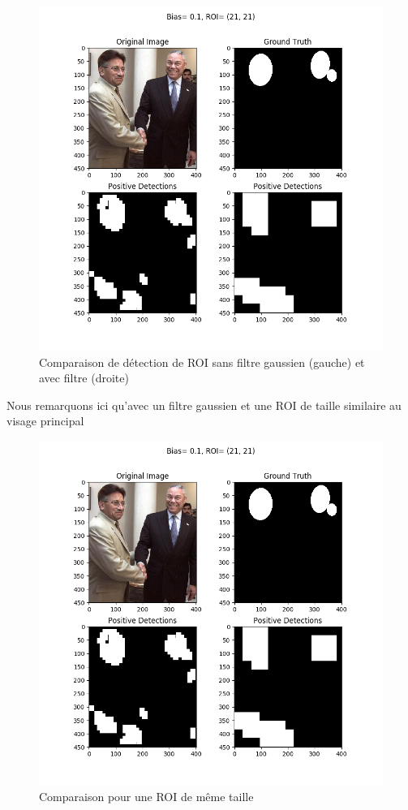 \documentclass[a4paper,11pt]{article}
\begin{document}
\begin{figure}[!h]
\begin{center}
    \includegraphics[scale=0.5]{gaussian_fig1.png}
    \caption{Comparaison de détection de ROI sans filtre gaussien (gauche) et avec
     filtre (droite)}
\end{center}
\end{figure}
Nous remarquons ici qu'avec un filtre gaussien et une ROI de taille similaire au
visage principal
\begin{figure}[!h]
\begin{center}
    \includegraphics[scale=0.5]{gaussian_fig1.png}
    \caption{Comparaison pour une ROI de même taille} 
\end{center}
\end{figure}
\end{document}
